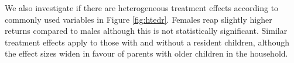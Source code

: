 \documentclass[12pt, a4paper]{article}
\begin{document}
We also investigate if there are heterogeneous treatment effects according to
commonly used variables in Figure \ref{fig:htedr}. Females reap slightly higher
returns compared to males although this is not statistically significant.
Similar treatment effects apply to those with and without a resident children,
although the effect sizes widen in favour of parents with older children in the
household. 
%
\
%
%
\end{document}
